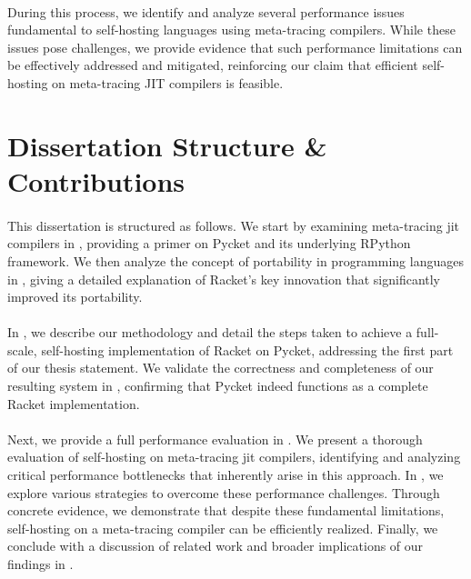         \paragraph{}%
            During this process, we identify and analyze several performance issues fundamental to self-hosting languages using meta-tracing compilers. While these issues pose challenges, we provide evidence that such performance limitations can be effectively addressed and mitigated, reinforcing our claim that efficient self-hosting on meta-tracing JIT compilers is feasible.

    \section[\texorpdfstring{Dissertation Structure \& Contributions}{Structure \& Contributions}]{Dissertation Structure \& Contributions}

        \paragraph{}%
            This dissertation is structured as follows. We start by examining meta-tracing \gls{jit} compilers in , providing a primer on Pycket and its underlying RPython framework. We then analyze the concept of portability in programming languages in , giving a detailed explanation of Racket's key innovation that significantly improved its portability.

        \paragraph{}%
            In , we describe our methodology and detail the steps taken to achieve a full-scale, self-hosting implementation of Racket on Pycket, addressing the first part of our thesis statement. We validate the correctness and completeness of our resulting system in , confirming that Pycket indeed functions as a complete Racket implementation.

        \paragraph{}%
            Next, we provide a full performance evaluation in . We present a thorough evaluation of self-hosting on meta-tracing \gls{jit} compilers, identifying and analyzing critical performance bottlenecks that inherently arise in this approach. In , we explore various strategies to overcome these performance challenges. Through concrete evidence, we demonstrate that despite these fundamental limitations, self-hosting on a meta-tracing compiler can be efficiently realized. Finally, we conclude with a discussion of related work and broader implications of our findings in .

